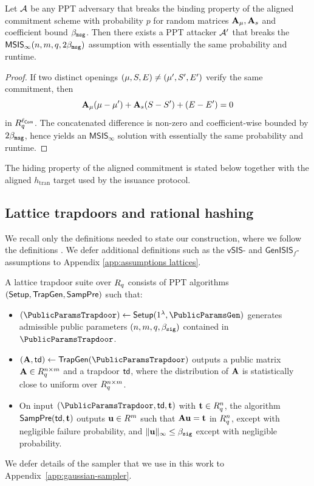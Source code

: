 \begin{lemma}\label{lem:ajtai-binding}
Let $\mathcal{A}$ be any PPT adversary that breaks the binding property of the aligned commitment scheme with
probability $p$ for random matrices $\mathbf{A}_\mu,\mathbf{A}_s$ and coefficient bound $\beta_{\mathtt{msg}}$. Then there exists a PPT
attacker $\mathcal{A}'$ that breaks the $\mathsf{MSIS}_\infty(n,m,q,2\beta_{\mathtt{msg}})$ assumption with essentially the same
probability and runtime.
\end{lemma}

\begin{proof}
If two distinct openings \((\mathbf{\mu},S,E)\neq(\mathbf{\mu}',S',E')\) verify the same commitment,
then
\[
\mathbf{A}_\mu(\mathbf{\mu}-\mathbf{\mu}')+\mathbf{A}_s(S-S')+(E-E')=0
\]
in \(R_q^{\ell_{\mathsf{Com}}}\). The concatenated difference is non-zero and coefficient-wise bounded by
\(2\beta_{\mathtt{msg}}\), hence yields an \(\mathsf{MSIS}_\infty\) solution with essentially the same probability and runtime.
\end{proof}

The hiding property of the aligned commitment is stated below together with the aligned
\(h_{\mathrm{tran}}\) target used by the issuance protocol.

\subsection{Lattice trapdoors and rational hashing}
\label{subsec:prelim-vsis}
We recall only the definitions needed to state our construction, where we follow the definitions \cite{EPRINT:DKLW25}. We defer additional definitions such as the $\mathsf{vSIS}$- and $\mathsf{GenISIS}_f$-assumptions to Appendix \ref{app:assumptions lattices}. 

\begin{definition}\label{def:trapdoor-suite}
A lattice trapdoor suite over \(R_q\) consists of PPT algorithms
$  (\mathsf{Setup},\mathsf{TrapGen},\mathsf{SampPre})
$
 such that:
\begin{itemize}[leftmargin=1.25em]
\item $(\PublicParamsTrapdoor)\gets \Setup(\SecParam,\PublicParamsGen)$ generates admissible public parameters \((n,m,q,\beta_{\mathtt{sig}})\) contained in $\PublicParamsTrapdoor$.
  \item \((\mA,\trapdoor)\gets \TrapGen(\PublicParamsTrapdoor)\) outputs a public matrix \(\mathbf{A}\in R_q^{n\times m}\) and a trapdoor
  \(\mathsf{td}\), where the distribution of \(\mathbf{A}\) is statistically close to uniform over \(R_q^{n\times m}\).
  \item On input \((\PublicParamsTrapdoor,\trapdoor,\vect)\) with \(\mathbf{t}\in R_q^n\), the algorithm \(\mathsf{SampPre}(\mathsf{td},\mathbf{t})\) outputs
  \(\mathbf{u}\in R^m\) such that \(\mathbf{A}\mathbf{u}=\mathbf{t}\) in \(R_q^n\), except with negligible failure probability, and
  \(\|\mathbf{u}\|_\infty\le \beta_{\mathtt{sig}}\) except with negligible probability.
\end{itemize}
\end{definition}
We defer details of the sampler that we use in this work to Appendix~\ref{app:gaussian-sampler}.


